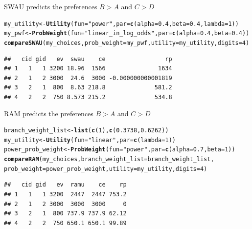 \documentclass{article}\usepackage[]{graphicx}\usepackage[]{color}
\makeatletter
\newcommand{\hlnum}[1]{\textcolor[rgb]{0.686,0.059,0.569}{#1}}%
\newcommand{\hlstr}[1]{\textcolor[rgb]{0.192,0.494,0.8}{#1}}%
\newcommand{\hlstd}[1]{\textcolor[rgb]{0.345,0.345,0.345}{#1}}%
\newcommand{\hlkwb}[1]{\textcolor[rgb]{0.69,0.353,0.396}{#1}}%
\newcommand{\hlkwc}[1]{\textcolor[rgb]{0.333,0.667,0.333}{#1}}%
\newcommand{\hlkwd}[1]{\textcolor[rgb]{0.737,0.353,0.396}{\textbf{#1}}}%
\newenvironment{kframe}{%
 \def\at@end@of@kframe{}%
 \ifinner\ifhmode%
  \def\at@end@of@kframe{\end{minipage}}%
  \begin{minipage}{\columnwidth}%
 \fi\fi%
 \def\FrameCommand##1{\hskip\@totalleftmargin \hskip-\fboxsep
 \colorbox{shadecolor}{##1}\hskip-\fboxsep
     \hskip-\linewidth \hskip-\@totalleftmargin \hskip\columnwidth}%
 \MakeFramed {\advance\hsize-\width
   \@totalleftmargin\z@ \linewidth\hsize
   \@setminipage}}%
 {\par\unskip\endMakeFramed%
 \at@end@of@kframe}
\newenvironment{knitrout}{}{} %
\makeatother
\begin{document}
SWAU predicts the preferences $B > A$ and $C > D$

\begin{knitrout}
\color{fgcolor}\begin{kframe}
\begin{alltt}
\hlstd{my_utility} \hlkwb{<-} \hlkwd{Utility}\hlstd{(}\hlkwc{fun}\hlstd{=}\hlstr{"power"}\hlstd{,} \hlkwc{par}\hlstd{=}\hlkwd{c}\hlstd{(}\hlkwc{alpha}\hlstd{=}\hlnum{0.4}\hlstd{,} \hlkwc{beta}\hlstd{=}\hlnum{0.4}\hlstd{,} \hlkwc{lambda}\hlstd{=}\hlnum{1}\hlstd{))}
\hlstd{my_pwf} \hlkwb{<-} \hlkwd{ProbWeight}\hlstd{(}\hlkwc{fun}\hlstd{=}\hlstr{"linear_in_log_odds"}\hlstd{,} \hlkwc{par}\hlstd{=}\hlkwd{c}\hlstd{(}\hlkwc{alpha}\hlstd{=}\hlnum{0.4}\hlstd{,} \hlkwc{beta}\hlstd{=}\hlnum{0.4}\hlstd{))}
\hlkwd{compareSWAU}\hlstd{(my_choices,} \hlkwc{prob_weight}\hlstd{=my_pwf,} \hlkwc{utility}\hlstd{=my_utility,} \hlkwc{digits}\hlstd{=}\hlnum{4}\hlstd{)}
\end{alltt}
\begin{verbatim}
##   cid gid   ev  swau    ce                 rp
## 1   1   1 3200 18.96  1566               1634
## 2   1   2 3000  24.6  3000 -0.000000000001819
## 3   2   1  800  8.63 218.8              581.2
## 4   2   2  750 8.573 215.2              534.8
\end{verbatim}
\end{kframe}
\end{knitrout}


RAM predicts the preferences $B > A$ and $C > D$

\begin{knitrout}
\color{fgcolor}\begin{kframe}
\begin{alltt}
\hlstd{branch_weight_list} \hlkwb{<-} \hlkwd{list}\hlstd{(}\hlkwd{c}\hlstd{(}\hlnum{1}\hlstd{),} \hlkwd{c}\hlstd{(}\hlnum{0.3738}\hlstd{,} \hlnum{0.6262}\hlstd{))}
\hlstd{my_utility} \hlkwb{<-} \hlkwd{Utility}\hlstd{(}\hlkwc{fun}\hlstd{=}\hlstr{"linear"}\hlstd{,} \hlkwc{par}\hlstd{=}\hlkwd{c}\hlstd{(}\hlkwc{lambda}\hlstd{=}\hlnum{1}\hlstd{))}
\hlstd{power_prob_weight} \hlkwb{<-} \hlkwd{ProbWeight}\hlstd{(}\hlkwc{fun}\hlstd{=}\hlstr{"power"}\hlstd{,} \hlkwc{par}\hlstd{=}\hlkwd{c}\hlstd{(}\hlkwc{alpha}\hlstd{=}\hlnum{0.7}\hlstd{,} \hlkwc{beta}\hlstd{=}\hlnum{1}\hlstd{))}
\hlkwd{compareRAM}\hlstd{(my_choices,} \hlkwc{branch_weight_list}\hlstd{=branch_weight_list,}
        \hlkwc{prob_weight}\hlstd{=power_prob_weight,} \hlkwc{utility}\hlstd{=my_utility,} \hlkwc{digits}\hlstd{=}\hlnum{4}\hlstd{)}
\end{alltt}
\begin{verbatim}
##   cid gid   ev  ramu    ce    rp
## 1   1   1 3200  2447  2447 753.2
## 2   1   2 3000  3000  3000     0
## 3   2   1  800 737.9 737.9 62.12
## 4   2   2  750 650.1 650.1 99.89
\end{verbatim}
\end{kframe}
\end{knitrout}
\end{document}
